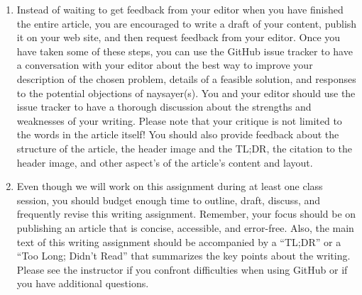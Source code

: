 \begin{enumerate}
  \item Instead of waiting to get feedback from your editor when you have finished the entire article, you are
    encouraged to write a draft of your content, publish it on your web site, and then request feedback from your
    editor. Once you have taken some of these steps, you can use the GitHub issue tracker to have a conversation with
    your editor about the best way to improve your description of the chosen problem, details of a feasible solution,
    and responses to the potential objections of naysayer(s). You and your editor should use the issue tracker to have a
    thorough discussion about the strengths and weaknesses of your writing. Please note that your critique is not
    limited to the words in the article itself! You should also provide feedback about the structure of the article, the
    header image and the TL;DR, the citation to the header image, and other aspect's of the article's content and
    layout.


  \item Even though we will work on this assignment during at least one class session, you should budget enough time to
    outline, draft, discuss, and frequently revise this writing assignment. Remember, your focus should be on publishing
    an article that is concise, accessible, and error-free. Also, the main text of this writing assignment should be
    accompanied by a ``TL;DR'' or a ``Too Long; Didn't Read'' that summarizes the key points about the writing. Please
    see the instructor if you confront difficulties when using GitHub or if you have additional questions.


\end{enumerate}

